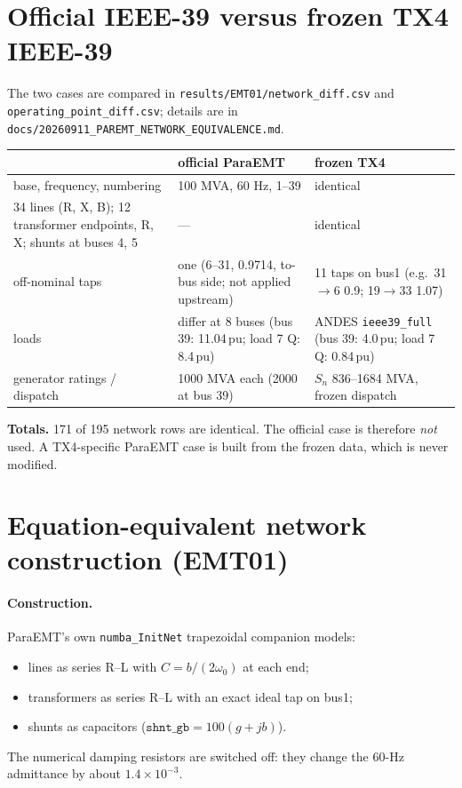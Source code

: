 \documentclass[10pt,a4paper]{article}
\newcommand{\f}[1]{\nolinkurl{#1}}
\begin{document}
\section{Official IEEE-39 versus frozen TX4 IEEE-39}

The two cases are compared in \f{results/EMT01/network_diff.csv} and
\f{operating_point_diff.csv}; details are in
\f{docs/20260911_PAREMT_NETWORK_EQUIVALENCE.md}.

\medskip
\noindent\begin{tabularx}{\linewidth}{@{}L{4.4cm}YY@{}}
\toprule
 & official ParaEMT & frozen TX4\\
\midrule
base, frequency, numbering & 100 MVA, 60 Hz, 1--39 & identical\\
34 lines (R, X, B); 12 transformer endpoints, R, X; shunts at buses 4, 5 & --- & identical\\
off-nominal taps & one (6--31, 0.9714, to-bus side; not applied upstream) & 11 taps on bus1 (e.g.\ 31$\to$6 0.9; 19$\to$33 1.07)\\
loads & differ at 8 buses (bus 39: 11.04\,pu; load 7 Q: 8.4\,pu) & ANDES \texttt{ieee39\_full} (bus 39: 4.0\,pu; load 7 Q: 0.84\,pu)\\
generator ratings / dispatch & 1000 MVA each (2000 at bus 39) & $S_n$ 836--1684 MVA, frozen dispatch\\
\bottomrule
\end{tabularx}

\medskip
\noindent\textbf{Totals.} 171 of 195 network rows are identical. The official
case is therefore \emph{not} used. A TX4-specific ParaEMT case is built from
the frozen data, which is never modified.

\section{Equation-equivalent network construction (EMT01)}

\paragraph{Construction.} ParaEMT's own \texttt{numba\_InitNet} trapezoidal
companion models:
\begin{itemize}
\item lines as series R--L with $C=b/(2\omega_0)$ at each end;
\item transformers as series R--L with an exact ideal tap on bus1;
\item shunts as capacitors ($\texttt{shnt\_gb}=100(g+jb)$).
\end{itemize}
The numerical damping resistors are switched off: they change the 60-Hz
admittance by about $1.4\times10^{-3}$.
\end{document}
